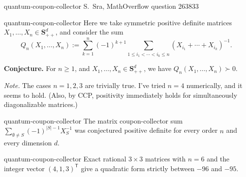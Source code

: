 \begin{cxsource}{quantum-coupon-collector}
S.~Sra, MathOverflow question 263833 \citeyearpar{Sra2017QuantumCoupon}
\end{cxsource}

\begin{cxstatement}{quantum-coupon-collector}
Here we take symmetric positive definite matrices $X_1,\ldots,X_n\in\mathbf{S}_{++}^d$, and consider the sum
\[
Q_n(X_1,\ldots,X_n):=\sum_{k=1}^n(-1)^{k+1}
\sum_{1\le i_1<\cdots<i_k\le n}\left(X_{i_1}+\cdots+X_{i_k}\right)^{-1}.
\]

\textbf{Conjecture.} For $n\ge1$, and $X_1,\ldots,X_n\in\mathbf{S}_{++}^d$, we have $Q_n(X_1,\ldots,X_n)\succ0$.

\emph{Note.} The cases $n=1,2,3$ are trivially true.  I've tried $n=4$ numerically, and it seems to hold.  (Also, by CCP, positivity immediately holds for simultaneously diagonalizable matrices.)
\end{cxstatement}

\begin{cxsummary}{quantum-coupon-collector}
The matrix coupon-collector sum $\sum_{\emptyset\ne S}(-1)^{|S|-1}X_S^{-1}$ was conjectured positive definite for every order $n$ and every dimension $d$.
\end{cxsummary}

\begin{cxcertificate}{quantum-coupon-collector}
Exact rational $3\times3$ matrices with $n=6$ and the integer vector $(4,1,3)^{\mathsf T}$ give a quadratic form strictly between $-96$ and $-95$.
\end{cxcertificate}

